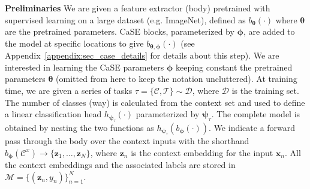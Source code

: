 \documentclass{article}
\begin{document}
\textbf{Preliminaries} We are given a feature extractor (body) pretrained with supervised learning on a large dataset (e.g. ImageNet), defined as $b_{\boldsymbol{\theta}}(\cdot)$ where $\boldsymbol{\theta}$ are the pretrained parameters. CaSE blocks, parameterized by $\boldsymbol{\phi}$, are added to the model at specific locations to give $b_{\boldsymbol{\theta}, \boldsymbol{\phi}}(\cdot)$ (see Appendix~\ref{appendix:sec_case_details} for details about this step). We are interested in learning the CaSE parameters $\boldsymbol{\phi}$ keeping constant the pretrained parameters $\boldsymbol{\theta}$ (omitted from here to keep the notation uncluttered). At training time, we are given a series of tasks $\tau=\{\mathcal{C}, \mathcal{T}\} \sim \mathcal{D}$, where $\mathcal{D}$ is the training set. The number of classes (way) is calculated from the context set and used to define a linear classification head $h_{\boldsymbol{\psi}_{\tau}}(\cdot)$ parameterized by $\boldsymbol{\psi}_{\tau}$. The complete model is obtained by nesting the two functions as $h_{\boldsymbol{\psi}_{\tau}}(b_{\boldsymbol{\phi}}(\cdot))$.
We indicate a forward pass through the body over the context inputs with the shorthand $b_{\boldsymbol{\phi}}(\mathcal{C}^x) \rightarrow \{ \mathbf{z}_1, \dots, \mathbf{z}_N \}$, where $\mathbf{z}_n$ is the context embedding for the input $\mathbf{x}_n$. All the context embeddings and the associated labels are stored in $\mathcal{M} = \{(\mathbf{z}_n, y_n)\}_{n=1}^{N}$.
\end{document}
